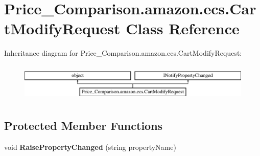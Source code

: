 \hypertarget{class_price___comparison_1_1amazon_1_1ecs_1_1_cart_modify_request}{\section{Price\-\_\-\-Comparison.\-amazon.\-ecs.\-Cart\-Modify\-Request Class Reference}
\label{class_price___comparison_1_1amazon_1_1ecs_1_1_cart_modify_request}
}


 


Inheritance diagram for Price\-\_\-\-Comparison.\-amazon.\-ecs.\-Cart\-Modify\-Request\-:\begin{figure}[H]
\begin{center}
\leavevmode
\includegraphics[height=1.830065cm]{class_price___comparison_1_1amazon_1_1ecs_1_1_cart_modify_request}
\end{center}
\end{figure}
\subsection*{Protected Member Functions}
\begin{DoxyCompactItemize}
\item 
\hypertarget{class_price___comparison_1_1amazon_1_1ecs_1_1_cart_modify_request_a11bd87e03d3acfc8ed5e0841e80c2d96}{void {\bfseries Raise\-Property\-Changed} (string property\-Name)}\label{class_price___comparison_1_1amazon_1_1ecs_1_1_cart_modify_request_a11bd87e03d3acfc8ed5e0841e80c2d96}

\end{DoxyCompactItemize}
